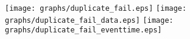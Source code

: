 \documentclass{article}
\begin{document}
\texttt{[image: graphs/duplicate\_fail.eps]} \pagebreak
\texttt{[image: graphs/duplicate\_fail\_data.eps]} \pagebreak
\texttt{[image: graphs/duplicate\_fail\_eventtime.eps]} \pagebreak
\end{document}
